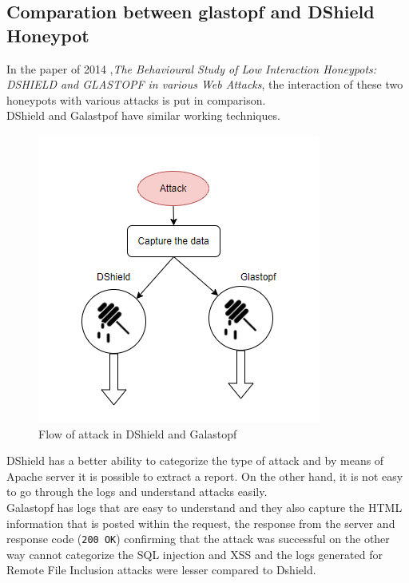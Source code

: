 \subsection{Comparation between glastopf and DShield Honeypot}
In the paper of 2014 ,\textit{The Behavioural Study of Low Interaction Honeypots: DSHIELD and GLASTOPF in various Web Attacks}\cite{dshieldandGlastopf}, the interaction of these two honeypots with various attacks is put in comparison.\\
DShield and Galastpof have similar working techniques.
\begin{figure}[h!]
  \centering
   \includegraphics{images/workingtecniques.png}
   \caption{Flow of attack in DShield and Galastopf}
  \label{fig:irradiances}
\end{figure}
\FloatBarrier
DShield has a better ability to categorize the type of attack and by means of Apache server it is possible to extract a report. On the other hand, it is not easy to go through the logs and understand attacks easily.\\
Galastopf has logs that are easy to understand and they also capture the HTML information that is posted within the request, the response from the server and response code (\texttt{200 OK}) confirming that the attack was successful on the other way cannot categorize the SQL injection and XSS and the logs generated for Remote File Inclusion attacks were lesser compared to Dshield.\\

